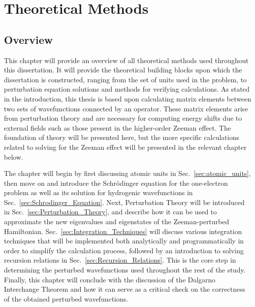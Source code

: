 \chapter{Theoretical Methods} \label{Theoretical_Methods}
    \section{Overview}
        This chapter will provide an overview of all theoretical methods used throughout this dissertation. It will provide the theoretical building blocks upon which the dissertation is constructed, ranging from the set of units used in the problem, to perturbation equation solutions and methods for verifying calculations. As stated in the introduction, this thesis is based upon calculating matrix elements between two sets of wavefunctions connected by an operator. These matrix elements arise from perturbation theory and are necessary for computing energy shifts due to external fields such as those present in the higher-order Zeeman effect. The foundation of theory will be presented here, but the more specific calculations related to solving for the Zeeman effect will be presented in the relevant chapter below.

        The chapter will begin by first discussing atomic units in Sec.~\ref{sec:atomic_units}, then move on and introduce the Schrödinger equation for the one-electron problem as well as its solution for hydrogenic wavefunctions in Sec.~\ref{sec:Schrodinger_Equation}. Next, Perturbation Theory will be introduced in Sec.~\ref{sec:Perturbation_Theory}, and describe how it can be used to approximate the new eigenvalues and eigenstates of the Zeeman-perturbed Hamiltonian. Sec.~\ref{sec:Integration_Techniques} will discuss various integration techniques that will be implemented both analytically and programmatically in order to simplify the calculation process, followed by an introduction to solving recursion relations in Sec.~\ref{sec:Recursion_Relations}. This is the core step in determining the perturbed wavefunctions used throughout the rest of the study. Finally, this chapter will conclude with the discussion of the Dalgarno Interchange Theorem and how it can serve as a critical check on the correctness of the obtained perturbed wavefunctions.

